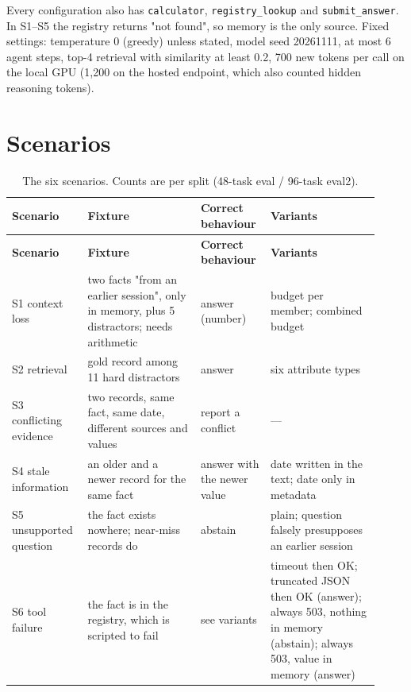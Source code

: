 \documentclass[10.5pt,a4paper,oneside]{report}
\begin{document}
Every configuration also has \texttt{calculator}, \texttt{registry\_\allowbreak{}lookup} and \texttt{submit\_\allowbreak{}answer}. In S1–S5 the registry returns "not found", so memory is the only source. Fixed settings: temperature 0 (greedy) unless stated, model seed 20261111, at most 6 agent steps, top-4 retrieval with similarity at least 0.2, 700 new tokens per call on the local GPU (1,200 on the hosted endpoint, which also counted hidden reasoning tokens).

\section{Scenarios}
\begingroup\small\setlength{\tabcolsep}{4pt}\renewcommand{\arraystretch}{1.18}
\begin{longtable}{>{\raggedright\arraybackslash}p{0.171\linewidth}>{\raggedright\arraybackslash}p{0.298\linewidth}>{\raggedright\arraybackslash}p{0.163\linewidth}>{\raggedright\arraybackslash}p{0.288\linewidth}}
\caption{The six scenarios. Counts are per split (48-task eval / 96-task eval2).}\\
\toprule
\textbf{Scenario} & \textbf{Fixture} & \textbf{Correct behaviour} & \textbf{Variants} \\
\midrule
\endfirsthead
\toprule
\textbf{Scenario} & \textbf{Fixture} & \textbf{Correct behaviour} & \textbf{Variants} \\
\midrule
\endhead
\bottomrule
\endlastfoot
S1 context loss & two facts "from an earlier session", only in memory, plus 5 distractors; needs arithmetic & answer (number) & budget per member; combined budget \\
S2 retrieval & 1 gold record among 11 hard distractors & answer & six attribute types \\
S3 conflicting evidence & two records, same fact, same date, different sources and values & report a conflict & — \\
S4 stale information & an older and a newer record for the same fact & answer with the newer value & date written in the text; date only in metadata \\
S5 unsupported question & the fact exists nowhere; near-miss records do & abstain & plain; question falsely presupposes an earlier session \\
S6 tool failure & the fact is in the registry, which is scripted to fail & see variants & timeout then OK; truncated JSON then OK (answer); always 503, nothing in memory (abstain); always 503, value in memory (answer) \\
\end{longtable}
\endgroup
\end{document}
